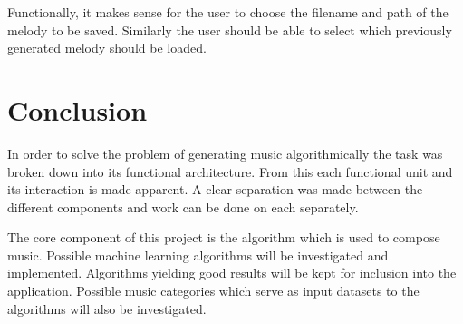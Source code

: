 Functionally, it makes sense for the user to choose the filename and path of the melody to be saved. Similarly the user should be able to select which previously generated melody should be loaded.

\chapter{Conclusion}
In order to solve the problem of generating music algorithmically the task was broken down into its functional architecture. From this each functional unit and its interaction is made apparent. A clear separation was made between the different components and work can be done on each separately. 

The core component of this project is the algorithm which is used to compose music. Possible machine learning algorithms will be investigated and implemented. Algorithms yielding good results will be kept for inclusion into the application. Possible music categories which serve as input datasets to the algorithms will also be investigated.

